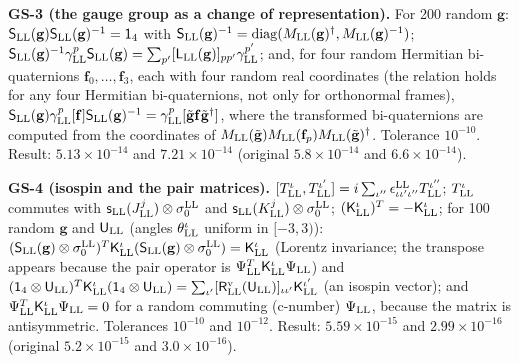 \documentclass[
  10pt,
]{article}
\begin{document}
\textbf{GS-3 (the gauge group as a change of representation).} For 200
random \(\mathbf g\):
\(\mathsf S_{\rm LL}(\mathbf g)\mathsf S_{\rm LL}(\mathbf g)^{-1}=\mathsf 1_4\)
with
\(\mathsf S_{\rm LL}(\mathbf g)^{-1}=\mathrm{diag}(M_{\rm LL}(\mathbf g)^\dagger,M_{\rm LL}(\mathbf g)^{-1})\);
\(\mathsf S_{\rm LL}(\mathbf g)^{-1}\gamma^p_{\rm LL}\mathsf S_{\rm LL}(\mathbf g)=\sum_{p'}[\mathsf L_{\rm LL}(\mathbf g)]_{pp'}\gamma^{p'}_{\rm LL}\);
and, for four random Hermitian bi-quaternions
\(\mathbf f_0,\dots,\mathbf f_3\), each with four random real
coordinates (the relation holds for any four Hermitian bi-quaternions,
not only for orthonormal frames),
\(\mathsf S_{\rm LL}(\mathbf g)\gamma^p_{\rm LL}[\mathbf f]\mathsf S_{\rm LL}(\mathbf g)^{-1}=\gamma^p_{\rm LL}[\tilde{\mathbf g}\mathbf f\tilde{\mathbf g}^\dagger]\),
where the transformed bi-quaternions are computed from the coordinates
of
\(M_{\rm LL}(\tilde{\mathbf g})M_{\rm LL}(\mathbf f_p)M_{\rm LL}(\tilde{\mathbf g})^\dagger\).
Tolerance \(10^{-10}\). Result: \(5.13\times10^{-14}\) and
\(7.21\times10^{-14}\) (original \(5.8\times10^{-14}\) and
\(6.6\times10^{-14}\)).

\textbf{GS-4 (isospin and the pair matrices).}
\([T^\iota_{\rm LL},T^{\iota'}_{\rm LL}]=i\sum_{\iota''}\epsilon^{\rm LL}_{\iota\iota'\iota''}T^{\iota''}_{\rm LL}\);
\(T^\iota_{\rm LL}\) commutes with
\(\mathsf s_{\rm LL}(J^j_{\rm LL})\otimes\sigma^{\rm LL}_0\) and
\(\mathsf s_{\rm LL}(K^j_{\rm LL})\otimes\sigma^{\rm LL}_0\);
\((\mathsf K^\iota_{\rm LL})^T=-\mathsf K^\iota_{\rm LL}\); for 100
random \(\mathbf g\) and \(\mathsf U_{\rm LL}\) (angles
\(\theta^\iota_{\rm LL}\) uniform in \([-3,3)\)):
\((\mathsf S_{\rm LL}(\mathbf g)\otimes\sigma^{\rm LL}_0)^T\mathsf K^\iota_{\rm LL}(\mathsf S_{\rm LL}(\mathbf g)\otimes\sigma^{\rm LL}_0)=\mathsf K^\iota_{\rm LL}\)
(Lorentz invariance; the transpose appears because the pair operator is
\(\Psi_{\rm LL}^T\mathsf K^\iota_{\rm LL}\Psi_{\rm LL}\)) and
\((\mathsf 1_4\otimes\mathsf U_{\rm LL})^T\mathsf K^\iota_{\rm LL}(\mathsf 1_4\otimes\mathsf U_{\rm LL})=\sum_{\iota'}[\mathsf R^{\rm v}_{\rm LL}(\mathsf U_{\rm LL})]_{\iota\iota'}\mathsf K^{\iota'}_{\rm LL}\)
(an isospin vector); and
\(\Psi_{\rm LL}^T\mathsf K^\iota_{\rm LL}\Psi_{\rm LL}=0\) for a random
commuting (c-number) \(\Psi_{\rm LL}\), because the matrix is
antisymmetric. Tolerances \(10^{-10}\) and \(10^{-12}\). Result:
\(5.59\times10^{-15}\) and \(2.99\times10^{-16}\) (original
\(5.2\times10^{-15}\) and \(3.0\times10^{-16}\)).
\end{document}
